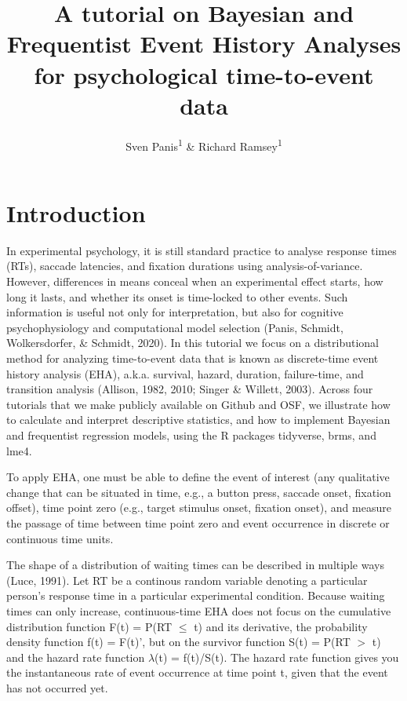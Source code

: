 \documentclass[
  man,floatsintext]{apa6}
\title{A tutorial on Bayesian and Frequentist Event History Analyses for psychological time-to-event data}
\author{Sven Panis\textsuperscript{1} \& Richard Ramsey\textsuperscript{1}}
\date{}
\affiliation{\vspace{0.5cm}\textsuperscript{1} ETH Zürich}
\begin{document}
\maketitle

\section{Introduction}\label{introduction}

In experimental psychology, it is still standard practice to analyse response times (RTs), saccade latencies, and fixation durations using analysis-of-variance. However, differences in means conceal when an experimental effect starts, how long it lasts, and whether its onset is time-locked to other events. Such information is useful not only for interpretation, but also for cognitive psychophysiology and computational model selection (Panis, Schmidt, Wolkersdorfer, \& Schmidt, 2020).
In this tutorial we focus on a distributional method for analyzing time-to-event data that is known as discrete-time event history analysis (EHA), a.k.a. survival, hazard, duration, failure-time, and transition analysis (Allison, 1982, 2010; Singer \& Willett, 2003). Across four tutorials that we make publicly available on Github and OSF, we illustrate how to calculate and interpret descriptive statistics, and how to implement Bayesian and frequentist regression models, using the R packages tidyverse, brms, and lme4.

To apply EHA, one must be able to define the event of interest (any qualitative change that can be situated in time, e.g., a button press, saccade onset, fixation offset), time point zero (e.g., target stimulus onset, fixation onset), and measure the passage of time between time point zero and event occurrence in discrete or continuous time units.

The shape of a distribution of waiting times can be described in multiple ways (Luce, 1991). Let RT be a continous random variable denoting a particular person's response time in a particular experimental condition. Because waiting times can only increase, continuous-time EHA does not focus on the cumulative distribution function F(t) = P(RT \(\leq\) t) and its derivative, the probability density function f(t) = F(t)', but on the survivor function S(t) = P(RT \(>\) t) and the hazard rate function \(\lambda\)(t) = f(t)/S(t). The hazard rate function gives you the instantaneous rate of event occurrence at time point t, given that the event has not occurred yet.
\end{document}
